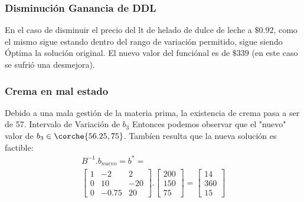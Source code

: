 \begin{homeworkProblem}[-1][Heladería]
\subsubsection{Disminución Ganancia de DDL}
En el caso de disminuir el precio del lt de helado de dulce de leche a $\$0.92$, como el mismo sigue estando dentro del rango de variación permitido, sigue siendo Óptima la solución original. El nuevo valor del funciónal es de $\$339$ (en este caso se sufrió una desmejora).


\subsubsection{Crema en mal estado}
Debido a una mala gestión de la materia prima, la existencia de crema pasa a ser de 57.
Intervalo de Variación de $b_3$
Entonces podemos observar que el "nuevo" valor de $b_3 \in \corche{56.25,75}$. Tambíen resulta que la nueva solución es factible:
\begin{align*}
    B^{-1}.b_{nuevo}=b^{*}=
    \\
    \begin{bmatrix}
   1 & -2 & 2 \\
   0 & 10 & -20 \\
   0 & -0.75 & 20
  \end{bmatrix}.
  \begin{bmatrix}
      200 \\
      150 \\
      75
  \end{bmatrix} = 
  \begin{bmatrix}
      14 \\
      360 \\
      15
  \end{bmatrix}
\end{align*}


\end{homeworkProblem}
